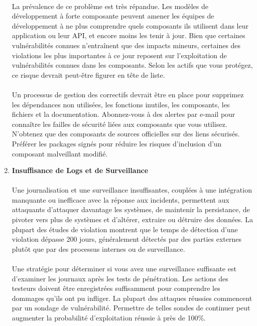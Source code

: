 \begin{enumerate}
	\paragraph{}
	La prévalence de ce problème est très répandue. Les modèles de développement à forte composante peuvent amener les équipes de développement à ne plus comprendre quels composants ils utilisent dans leur application ou leur API, et encore moins les tenir à jour. 
	Bien que certaines vulnérabilités connues n'entraînent que des impacts mineurs, certaines des violations les plus importantes à ce jour reposent sur l'exploitation de vulnérabilités connues dans les composants. Selon les actifs que vous protégez, ce risque devrait peut-être figurer en tête de liste.
	\paragraph{}
	Un processus de gestion des correctifs devrait être en place pour supprimez les dépendances non utilisées, les fonctions inutiles, les composants, les fichiers et la documentation.
	Abonnez-vous à des alertes par e-mail pour connaître les failles de sécurité liées aux composants que vous utilisez.
	N'obtenez que des composants de sources officielles sur des liens sécurisés. Préférer les packages signés pour réduire les risques d'inclusion d'un composant malveillant modifié.

	\vspace*{0.8cm} \item \textbf{Insuffisance de Logs et de Surveillance} \vspace*{-0.4cm}
	\paragraph{}
	Une journalisation et une surveillance insuffisantes, couplées à une intégration manquante ou inefficace avec la réponse aux incidents, permettent aux attaquants d'attaquer davantage les systèmes, de maintenir la persistance, de pivoter vers plus de systèmes et d'altérer, extraire ou détruire des données. La plupart des études de violation montrent que le temps de détection d'une violation dépasse 200 jours, généralement détectés par des parties externes plutôt que par des processus internes ou de surveillance.
	\paragraph{}
	Une stratégie pour déterminer si vous avez une surveillance suffisante est d'examiner les journaux après les tests de pénétration. Les actions des testeurs doivent être enregistrées suffisamment pour comprendre les dommages qu'ils ont pu infliger.
	La plupart des attaques réussies commencent par un sondage de vulnérabilité. Permettre de telles sondes de continuer peut augmenter la probabilité d'exploitation réussie à près de 100\%.

\end{enumerate}
